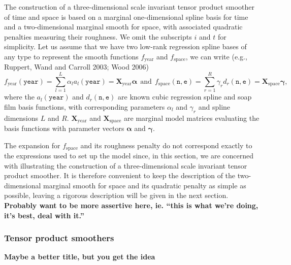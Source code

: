 \documentclass[10pt] {article}
\theoremstyle{definition}
\theoremstyle{plain}
\begin{document}
The construction of a three-dimensional scale invariant tensor product smoother of time and space is based on a marginal one-dimensional spline basis for time and a two-dimensional marginal smooth for space, with associated quadratic penalties measuring their roughness. We omit the subscripts $i$ and $t$ for simplicity. Let us assume that we have two low-rank regression spline bases of any type to represent the smooth functions $f_\text{year}$ and $f_\text{space}$, we can write (e.g., Ruppert, Wand and Carroll 2003; Wood 2006)
$$
f_\text{year}(\texttt{year})=\sum_{l=1}^L \alpha_l a_l(\texttt{year})=\textbf{X}_\text{year}\bm\alpha \ \ \text{and} \ \ f_\text{space}(\texttt{n},\texttt{e})=\sum_{r=1}^R \gamma_r d_r(\texttt{n},\texttt{e})=\textbf{X}_\text{space}\bm\gamma,
$$
where the $a_l(\texttt{year})$ and $d_r(\texttt{n},\texttt{e})$ are known cubic regression spline and soap film basis functions, with corresponding parameters $\alpha_l$ and $\gamma_r$ and spline dimensions $L$ and $R$. $\textbf{X}_\text{year}$ and $\textbf{X}_\text{space}$ are marginal model matrices evaluating the basis functions with parameter vectors $\bm\alpha$ and $\bm\gamma$. 

The expansion for $f_\text{space}$ and its roughness penalty do not correspond exactly to the expressions used to set up the model since, in this section, we are concerned with illustrating the construction of a three-dimensional scale invariant tensor product smoother. It is therefore convenient to keep the description of the two-dimensional marginal smooth for space and its quadratic penalty as simple as possible, leaving a rigorous description will be given in the next section. {\bf Probably want to be more assertive here, ie. ``this is what we're doing, it's best, deal with it.''}

\subsubsection{Tensor product smoothers}

{\bf Maybe a better title, but you get the idea}
\end{document}
